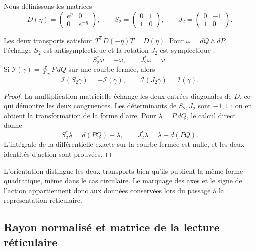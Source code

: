 Nous définissons les matrices
\begin{equation}
 D(\eta)=\begin{pmatrix}e^\eta&0\\0&e^{-\eta}\end{pmatrix},
 \qquad
 S_2=\begin{pmatrix}0&1\\1&0\end{pmatrix},
 \qquad
 J_2=\begin{pmatrix}0&-1\\1&0\end{pmatrix}.
 \label{x_reciprocidad:iv:ellipse:transportes}
\end{equation}

\begin{proposition}
\label{x_reciprocidad:iv:ellipse:accion-reciproca}
Les deux transports satisfont
\(T^{\mathsf T}D(-\eta)T=D(\eta)\).
Pour \(\omega=dQ\wedge dP\), l’échange \(S_2\) est
antisymplectique et la rotation \(J_2\) est symplectique :
\[
 S_2^*\omega=-\omega,\qquad J_2^*\omega=\omega.
\]
Si \(\mathcal I(\gamma)=\oint_\gamma P\,dQ\) sur une
courbe fermée, alors
\begin{equation}
 \mathcal I(S_2\gamma)=-\mathcal I(\gamma),\qquad
 \mathcal I(J_2\gamma)=\mathcal I(\gamma).
 \label{x_reciprocidad:iv:ellipse:signos-accion}
\end{equation}
\end{proposition}
\begin{proof}
La multiplication matricielle échange les deux entrées
diagonales de \(D\), ce qui démontre les deux congruences.
Les déterminants de \(S_2,J_2\) sont \(-1,1\) ;
on en obtient la transformation de la forme d’aire.
Pour \(\lambda=P\,dQ\), le calcul direct donne
\[
 S_2^*\lambda=d(PQ)-\lambda,\qquad
 J_2^*\lambda=\lambda-d(PQ).
\]
L’intégrale de la différentielle exacte sur la courbe fermée
est nulle, et les deux identités d’action sont prouvées.
\end{proof}

L’orientation distingue les deux transports bien qu’ils publient
la même forme quadratique, même dans le cas circulaire.
Le marquage des axes et le signe de l’action appartiennent
donc aux données conservées lors du passage à la
représentation réticulaire.

\subsection{Rayon normalisé et matrice de la lecture réticulaire}
\label{x_reciprocidad:iv:ellipse:radio}

